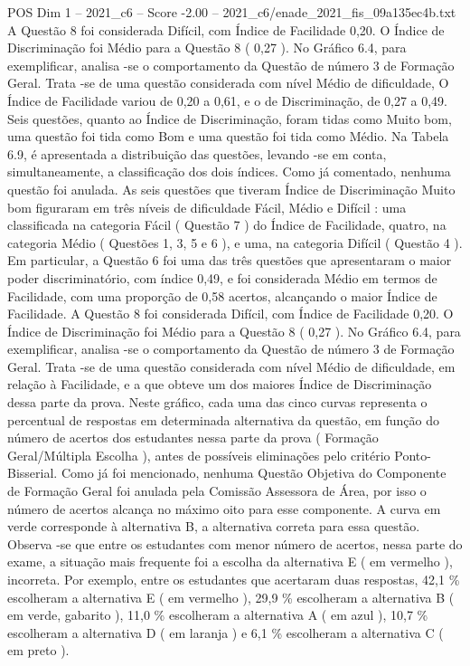 \begin{textsample}{POS Dim 1 – 2021\_c6 – Score -2.00 – 2021\_c6/enade\_2021\_fis\_09a135ec4b.txt}
A Questão 8 foi considerada Difícil, com Índice de Facilidade 0,20.
O Índice de Discriminação foi Médio para a Questão 8 ( 0,27 ).
No Gráfico 6.4, para exemplificar, analisa -se o comportamento da Questão de número 3 de Formação Geral.
Trata -se de uma questão considerada com nível Médio de dificuldade, O Índice de Facilidade variou de 0,20 a 0,61, e o de Discriminação, de 0,27 a 0,49.
Seis questões, quanto ao Índice de Discriminação, foram tidas como Muito bom, uma questão foi tida como Bom e uma questão foi tida como Médio.
Na Tabela 6.9, é apresentada a distribuição das questões, levando -se em conta, simultaneamente, a classificação dos dois índices.
Como já comentado, nenhuma questão foi anulada.
As seis questões que tiveram Índice de Discriminação Muito bom figuraram em três níveis de dificuldade Fácil, Médio e Difícil : uma classificada na categoria Fácil ( Questão 7 ) do Índice de Facilidade, quatro, na categoria Médio ( Questões 1, 3, 5 e 6 ), e uma, na categoria Difícil ( Questão 4 ).
Em particular, a Questão 6 foi uma das três questões que apresentaram o maior poder discriminatório, com índice 0,49, e foi considerada Médio em termos de Facilidade, com uma proporção de 0,58 acertos, alcançando o maior Índice de Facilidade.
A Questão 8 foi considerada Difícil, com Índice de Facilidade 0,20.
O Índice de Discriminação foi Médio para a Questão 8 ( 0,27 ).
No Gráfico 6.4, para exemplificar, analisa -se o comportamento da Questão de número 3 de Formação Geral.
Trata -se de uma questão considerada com nível Médio de dificuldade, em relação à Facilidade, e a que obteve um dos maiores Índice de Discriminação dessa parte da prova.
Neste gráfico, cada uma das cinco curvas representa o percentual de respostas em determinada alternativa da questão, em função do número de acertos dos estudantes nessa parte da prova ( Formação Geral/Múltipla Escolha ), antes de possíveis eliminações pelo critério Ponto-Bisserial.
Como já foi mencionado, nenhuma Questão Objetiva do Componente de Formação Geral foi anulada pela Comissão Assessora de Área, por isso o número de acertos alcança no máximo oito para esse componente.
A curva em verde corresponde à alternativa B, a alternativa correta para essa questão.
Observa -se que entre os estudantes com menor número de acertos, nessa parte do exame, a situação mais frequente foi a escolha da alternativa E ( em vermelho ), incorreta.
Por exemplo, entre os estudantes que acertaram duas respostas, 42,1 \% escolheram a alternativa E ( em vermelho ), 29,9 \% escolheram a alternativa B ( em verde, gabarito ), 11,0 \% escolheram a alternativa A ( em azul ), 10,7 \% escolheram a alternativa D ( em laranja ) e 6,1 \% escolheram a alternativa C ( em preto ).

\end{textsample}
